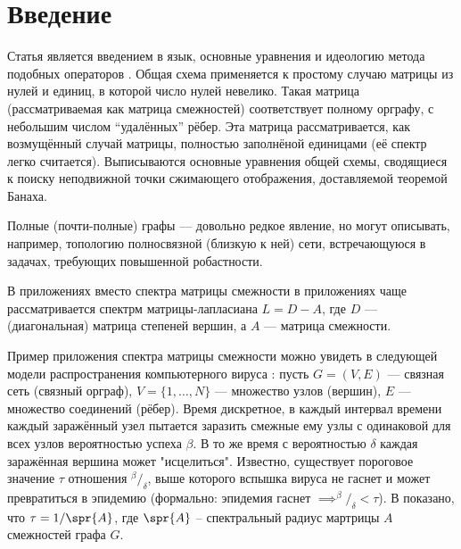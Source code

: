\section{Введение}

Статья является введением в язык, основные уравнения и идеологию
метода подобных операторов \cite{baskakov-harmonic}.
Общая схема применяется к простому случаю матрицы из нулей и единиц,
в которой число нулей невелико.
Такая матрица (рассматриваемая как матрица смежностей)
соответствует полному орграфу, с небольшим числом ``удалённых'' рёбер.
Эта матрица рассматривается, как возмущённый случай матрицы,
полностью заполнёной единицами (её спектр легко считается).
Выписываются основные уравнения общей схемы,
сводящиеся к поиску неподвижной точки сжимающего отображения,
доставляемой теоремой Банаха.

Полные (почти-полные) графы --- довольно редкое явление,
но могут описывать, например, топологию полносвязной (близкую к ней) сети,
встречающуюся в задачах, требующих повышенной робастности.

В приложениях вместо спектра матрицы смежности в приложениях чаще рассматривается
спектрм матрицы-лапласиана \( L = D - A \),
где \( D \) --- (диагональная) матрица степеней вершин,
а \( A \) --- матрица смежности.

Пример приложения спектра матрицы смежности можно увидеть
в следующей модели распространения компьютерного вируса \cite{epidemic-eigenvalues}:
пусть \( G = (V, E) \) --- связная сеть (связный орграф),
\( V = \{1, \ldots, N\} \) --- множество узлов (вершин),
\( E \) --- множество соединений (рёбер).
Время дискретное, в каждый интервал времени каждый заражённый узел
пытается заразить смежные ему узлы с одинаковой для всех узлов вероятностью успеха \( \beta \).
В то же время с вероятностью \( \delta \) каждая заражённая вершина может "исцелиться".
Известно, существует пороговое значение \( \tau \) отношения \( {^\beta}/_{\delta} \),
выше которого вспышка вируса не гаснет и может превратиться в эпидемию
(формально: эпидемия гаснет \( \implies ^{\beta}/_{\delta} < \tau \)). 
В \cite{epidemic-eigenvalues} показано, что \( \tau = 1/\spr{A} \),
где \( \spr{A} \) -- спектральный радиус мартрицы \( A \) смежностей графа \( G \).
